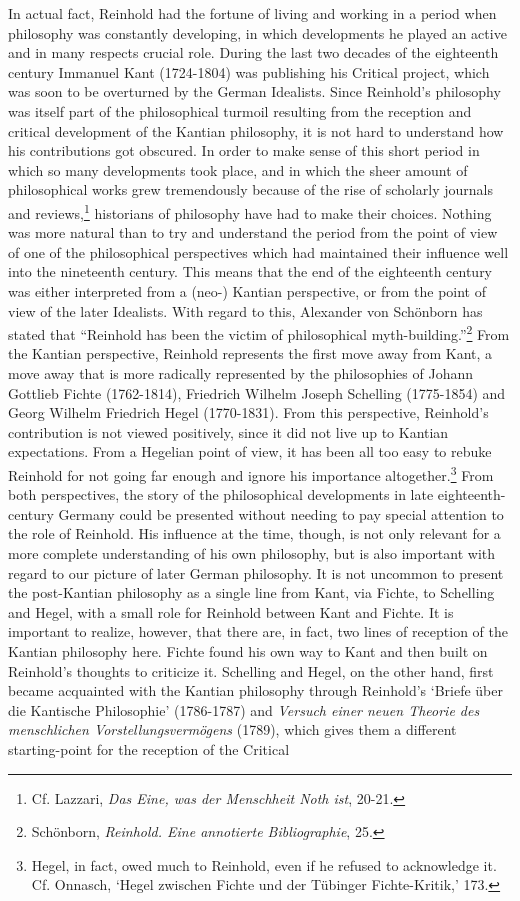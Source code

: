In actual fact, Reinhold had the fortune of living and working in a period when philosophy was constantly developing, in which developments he played an active and in many respects crucial role. During the last two decades of the eighteenth century Immanuel Kant (1724{-}1804) was publishing his Critical project, which was soon to be overturned by the German Idealists. Since Reinhold's philosophy was itself part of the philosophical turmoil resulting from the reception and critical development of the Kantian philosophy, it is not hard to understand how his contributions got obscured. In order to make sense of this short period in which so many developments took place, and in which the sheer amount of philosophical works grew tremendously because of the rise of scholarly journals and reviews,\footnote{ Cf. Lazzari, \textit{Das Eine, was der Menschheit Noth ist}, 20{-}21.} historians of philosophy have had to make their choices. Nothing was more natural than to try and understand the period from the point of view of one of the philosophical perspectives which had maintained their influence well into the nineteenth century. This means that the end of the eighteenth century was either interpreted from a (neo{-}) Kantian perspective, or from the point of view of the later Idealists. With regard to this, Alexander von Sch\"{o}nborn has stated that ``Reinhold has been the victim of philosophical myth{-}building.''\footnote{ Sch\"{o}nborn, \textit{Reinhold. Eine annotierte Bibliographie}, 25.} From the Kantian perspective, Reinhold represents the first move away from Kant, a move away that is more radically represented by the philosophies of Johann Gottlieb Fichte (1762{-}1814), Friedrich Wilhelm Joseph Schelling (1775{-}1854) and Georg Wilhelm Friedrich Hegel (1770{-}1831). From this perspective, Reinhold's contribution is not viewed positively, since it did not live up to Kantian expectations. From a Hegelian point of view, it has been all too easy to rebuke Reinhold for not going far enough and ignore his importance altogether.\footnote{ Hegel, in fact, owed much to Reinhold, even if he refused to acknowledge it. Cf. Onnasch, `Hegel zwischen Fichte und der T\"{u}binger Fichte{-}Kritik,' 173. } From both perspectives, the story of the philosophical developments in late eighteenth{-}century Germany could be presented without needing to pay special attention to the role of Reinhold. His influence at the time, though, is not only relevant for a more complete understanding of his own philosophy, but is also important with regard to our picture of later German philosophy. It is not uncommon to present the post{-}Kantian philosophy as a single line from Kant, via Fichte, to Schelling and Hegel, with a small role for Reinhold between Kant and Fichte. It is important to realize, however, that there are, in fact, two lines of reception of the Kantian philosophy here. Fichte found his own way to Kant and then built on Reinhold's thoughts to criticize it. Schelling and Hegel, on the other hand, first became acquainted with the Kantian philosophy through Reinhold's `Briefe \"{u}ber die Kantische Philosophie' (1786{-}1787) and \textit{Versuch einer neuen Theorie des menschlichen Vorstellungsverm\"{o}gens} (1789), which gives them a different starting{-}point for the reception of the Critical 
